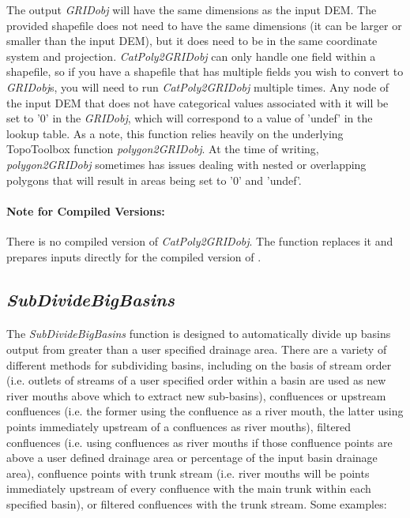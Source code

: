 \noindent
The output \textit{GRIDobj} will have the same dimensions as the input DEM. The provided shapefile does not need to have the same dimensions (it can be larger or smaller than the input DEM), but it does need to be in the same coordinate system and projection.  \textit{CatPoly2GRIDobj} can only handle one field within a shapefile, so if you have a shapefile that has multiple fields you wish to convert to \textit{GRIDobj}s, you will need to run \textit{CatPoly2GRIDobj} multiple times. Any node of the input DEM that does not have categorical values associated with it will be set to '0' in the \textit{GRIDobj}, which will correspond to a value of 'undef' in the lookup table. As a note, this function relies heavily on the underlying TopoToolbox function \textit{polygon2GRIDobj}. At the time of writing, \textit{polygon2GRIDobj} sometimes has issues dealing with nested or overlapping polygons that will result in areas being set to '0' and 'undef'.

\paragraph{Note for Compiled Versions:} There is no compiled version of \textit{CatPoly2GRIDobj}. The  function replaces it and prepares inputs directly for the compiled version of .

\subsection{\textit{SubDivideBigBasins}} \label{sec:SbDvdBsn}
\paragraph{}The \textit{SubDivideBigBasins} function is designed to automatically divide up basins output from  greater than a user specified drainage area. There are a variety of different methods for subdividing basins, including on the basis of stream order (i.e. outlets of streams of a user specified order within a basin are used as new river mouths above which to extract new sub-basins), confluences or upstream confluences (i.e. the former using the confluence as a river mouth, the latter using points immediately upstream of a confluences as river mouths), filtered confluences (i.e. using confluences as river mouths if those confluence points are above a user defined drainage area or percentage of the input basin drainage area), confluence points with trunk stream (i.e. river mouths will be points immediately upstream of every confluence with the main trunk within each specified basin), or filtered confluences with the trunk stream. Some examples:

